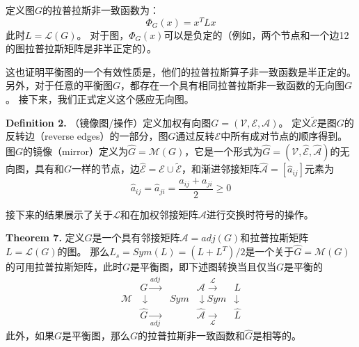 \documentclass{article}
\begin{document}
定义图$G$的拉普拉斯非一致函数为：
\begin{equation}
    \Phi_G(x) = x^T Lx
    \tag{24}
    \label{24}
\end{equation}
此时$L=\mathcal{L}(G)$。
对于图，$\Phi_G(x)$可以是负定的（例如，两个节点和一个边12的图拉普拉斯矩阵是非半正定的）。

这也证明平衡图的一个有效性质是，他们的拉普拉斯算子非一致函数是半正定的。
另外，对于任意的平衡图$G$，都存在一个具有相同拉普拉斯非一致函数的无向图$G$。
接下来，我们正式定义这个感应无向图。

\noindent \textbf{Definition 2.} （镜像图/操作）定义加权有向图$G=(\mathcal{V}, \mathcal{E}, \mathcal{A})$。
定义$\tilde{\mathcal{E}}$是图$G$的反转边（reverse edges）的一部分，图$G$通过反转$\mathcal{E}$中所有成对节点的顺序得到。
图$G$的镜像（mirror）定义为$\hat{G}=\mathcal{M}(G)$，它是一个形式为$\hat{G}=(\mathcal{V}, \hat{\mathcal{E}}, \hat{\mathcal{A}})$的无向图，具有和$G$一样的节点，边$\hat{\mathcal{E}}=\mathcal{E}\cup \tilde{\mathcal{E}}$，和渐进邻接矩阵$\hat{\mathcal{A}}=[\hat{a}_{ij}]$元素为
\begin{equation}
    \hat{a}_{ij}=\hat{a}_{ji}=\frac{a_{ij}+a_{ji}}{2}\ge 0
    \tag{25}
    \label{25}
\end{equation}

接下来的结果展示了关于$\mathcal{L}$和在加权邻接矩阵$\mathcal{A}$进行交换时符号的操作。

\noindent \textbf{Theorem 7.} 定义$G$是一个具有邻接矩阵$\mathcal{A}=adj(G)$和拉普拉斯矩阵$L=\mathcal{L}(G)$的图。
那么$L_s = Sym(L) = (L+L^T)/2$是一个关于$\hat{G}=\mathcal{M}(G)$的可用拉普拉斯矩阵，此时$G$是平衡图，即下述图转换当且仅当$G$是平衡的
\begin{equation}
    \begin{aligned}
                    &G \xrightarrow{adj}         &\mathcal{A} \xrightarrow{\mathcal{L}}          &L \\
        \mathcal{M} &\downarrow \quad\quad Sym   &\downarrow  Sym                      &\downarrow \\
                    &\hat{G} \xrightarrow[adj]{} &\hat{\mathcal{A}} \xrightarrow[\mathcal{L}]{}  &\hat{L} 
    \end{aligned}
    \tag{26}
    \label{26}
\end{equation}
此外，如果$G$是平衡图，那么$G$的拉普拉斯非一致函数和$\hat{G}$是相等的。
\end{document}
